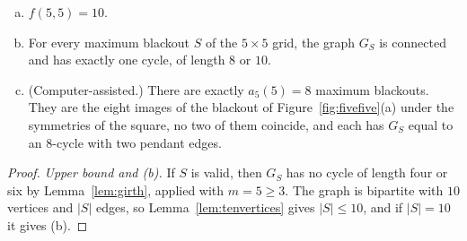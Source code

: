 \begin{theorem}\label{thm:fivefive}
\begin{enumerate}[(a)]
\item $f(5,5)=10$.
\item For every maximum blackout $S$ of the $5\times5$ grid, the graph $G_S$ is connected and
has exactly one cycle, of length $8$ or $10$.
\item (Computer-assisted.) There are exactly $a_5(5)=8$ maximum blackouts. They are the eight
images of the blackout of Figure~\ref{fig:fivefive}(a) under the symmetries of the square,
no two of them coincide, and each has $G_S$ equal to an $8$-cycle with two pendant edges.
\end{enumerate}
\end{theorem}

\begin{proof}
\emph{Upper bound and (b).} If $S$ is valid, then $G_S$ has no cycle of length four or six by
Lemma~\ref{lem:girth}, applied with $m=5\ge3$. The graph is bipartite with $10$ vertices and
$|S|$ edges, so Lemma~\ref{lem:tenvertices} gives $|S|\le10$, and if $|S|=10$ it gives (b).


\end{proof}

